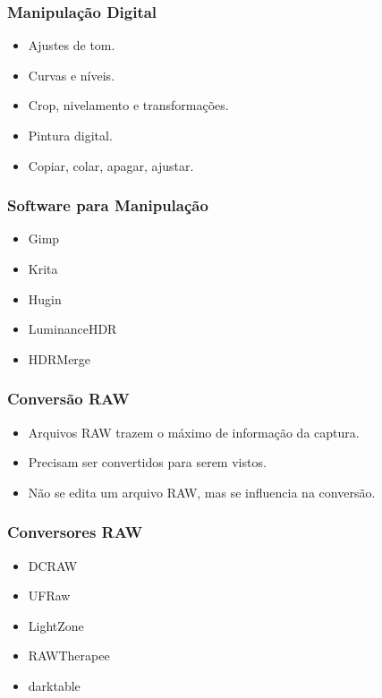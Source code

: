 
\begin{frame}
    \frametitle{Manipulação Digital}
    \begin{itemize}
        \item Ajustes de tom.
        \item Curvas e níveis.
        \item Crop, nivelamento e transformações.
        \item Pintura digital.
        \item Copiar, colar, apagar, ajustar.
    \end{itemize}
\end{frame}


\begin{frame}
    \frametitle{Software para Manipulação}
    \begin{itemize}
        \item Gimp
        \item Krita
        \item Hugin
        \item LuminanceHDR
        \item HDRMerge
    \end{itemize}
\end{frame}


\begin{frame}
    \frametitle{Conversão RAW}
    \begin{itemize}
        \item Arquivos RAW trazem o máximo de informação da captura.
        \item Precisam ser convertidos para serem vistos.
        \item Não se edita um arquivo RAW, mas se influencia na conversão.
    \end{itemize}
\end{frame}


\begin{frame}
    \frametitle{Conversores RAW}
    \begin{itemize}
        \item DCRAW
        \item UFRaw
        \item LightZone
        \item RAWTherapee
        \item darktable
    \end{itemize}
\end{frame}

